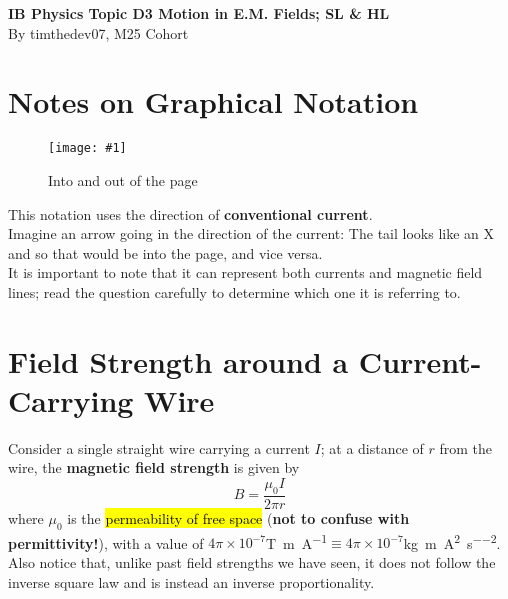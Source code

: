 \documentclass[a4paper,12pt]{article}
\let\oldsection\section
\renewcommand\section{\clearpage\oldsection}
\let\oldsi\si
\renewcommand{\si}[1]{\oldsi[per-mode=reciprocal-positive-first]{#1}}
\newcommand{\lb}{\\[8pt]}
\newcommand{\img}[4]{\begin{center}
  \begin{figure}[H]
    \centering
    \texttt{[image: \#1]}
    \caption{#3}
    \label{fig:#4}
  \end{figure}
\end{center}}
\begin{document}
\pagestyle{fancy}


\begin{titlepage}
  \begin{center}

    \vspace*{8cm}
    \textbf{\Large {IB Physics Topic D3 Motion in E.M. Fields; SL \& HL}} \\
    \vspace*{1cm}
    \large{By timthedev07, M25 Cohort}


  \end{center}
\end{titlepage}

\pagebreak
\tableofcontents
\pagebreak

\clearpage
\setcounter{page}{1}

\section{Notes on Graphical Notation}

\img{intooutof.jpg}{0.6}{Into and out of the page}{intooutof}

This notation uses the direction of \textbf{conventional current}.\lb
Imagine an arrow going in the direction of the current: The tail looks like an X and so that would be into the page, and vice versa.\lb
It is important to note that it can represent both currents and magnetic field lines; read the question carefully to determine which one it is referring to.

\section{Field Strength around a Current-Carrying Wire}

Consider a single straight wire carrying a current $I$; at a distance of $r$ from the wire, the \textbf{magnetic field strength} is given by
\begin{equation}\label{eq:wire_fieldstrength}
  B = \frac{\mu_0I}{2\pi r}
\end{equation}
where $\mu_0$ is the \hl{permeability of free space} (\textbf{not to confuse with permittivity!}), with a value of $4\pi \times 10^{-7}$\si{\tesla\metre\per\ampere}$ \equiv 4\pi \times 10^{-7} $\si{\kilo\gram\meter\per\ampere\squared\per\second\squared}.\lb
Also notice that, unlike past field strengths we have seen, it does not follow the inverse square law and is instead an inverse proportionality.
\end{document}
